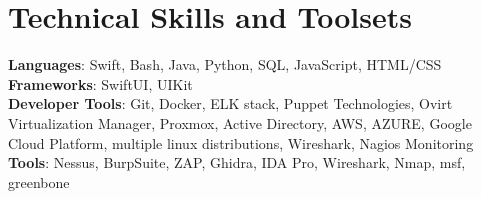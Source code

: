 \documentclass[letterpaper,11pt]{article}
\makeatletter
\newcommand{\resumeItem}[1]{
  \item\small{
    {#1 \vspace{-2pt}}
  }
}
\newcommand{\resumeProjectHeading}[2]{
    \item
    \begin{tabular*}{0.97\textwidth}{l@{\extracolsep{\fill}}r}
      \small#1 & #2 \\
    \end{tabular*}\vspace{-7pt}
}
\newcommand{\resumeSubHeadingListStart}{\begin{itemize}[leftmargin=0.15in, label={}]}
\newcommand{\resumeSubHeadingListEnd}{\end{itemize}}
\newcommand{\resumeItemListStart}{\begin{itemize}}
\newcommand{\resumeItemListEnd}{\end{itemize}\vspace{-5pt}}
\makeatother
\begin{document}



%
\section{Technical Skills and Toolsets}
 \begin{itemize}[leftmargin=0.15in, label={}]
    \small{\item{
     \textbf{Languages}{: Swift, Bash, Java, Python, SQL, JavaScript, HTML/CSS} \\
     \textbf{Frameworks}{: SwiftUI, UIKit } \\
     \textbf{Developer Tools}{: Git, Docker, ELK stack, Puppet Technologies, Ovirt Virtualization Manager, Proxmox, Active Directory,  AWS, AZURE, Google Cloud Platform, multiple linux distributions, Wireshark, Nagios Monitoring} \\
     \textbf{Tools}{: Nessus, BurpSuite, ZAP, Ghidra, IDA Pro, Wireshark, Nmap, msf, greenbone}
    }}
 \end{itemize}
\end{document}
